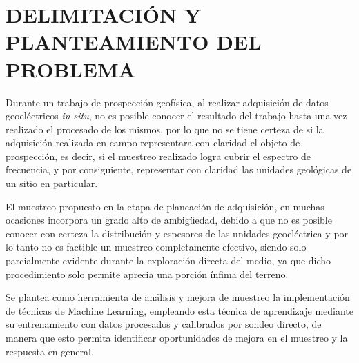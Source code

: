 \chapter{DELIMITACIÓN Y PLANTEAMIENTO DEL PROBLEMA}

Durante un trabajo de prospección geofísica, al realizar adquisición de datos geoeléctricos \textit{in situ}, no es posible conocer el resultado del trabajo hasta una vez realizado el procesado de los mismos, por lo que no se tiene certeza de si la adquisición realizada en campo representara con claridad el objeto de prospección, es decir, si el muestreo realizado logra cubrir el espectro de frecuencia, y por consiguiente, representar con claridad las unidades geológicas de un sitio en particular.

El muestreo propuesto en la etapa de planeación de adquisición, en muchas ocasiones incorpora un grado alto de ambigüedad, debido a que no es posible conocer con certeza la distribución y espesores de las unidades geoeléctrica y por lo tanto no es factible un muestreo completamente efectivo, siendo solo parcialmente evidente durante la exploración directa del medio, ya que dicho procedimiento solo permite aprecia una porción ínfima del terreno.

Se plantea como herramienta de análisis y mejora de muestreo la implementación de técnicas de Machine Learning, empleando esta técnica de aprendizaje mediante su entrenamiento con datos procesados y calibrados por sondeo directo, de manera que esto permita identificar oportunidades de mejora en el muestreo y la respuesta en  general.


  
     